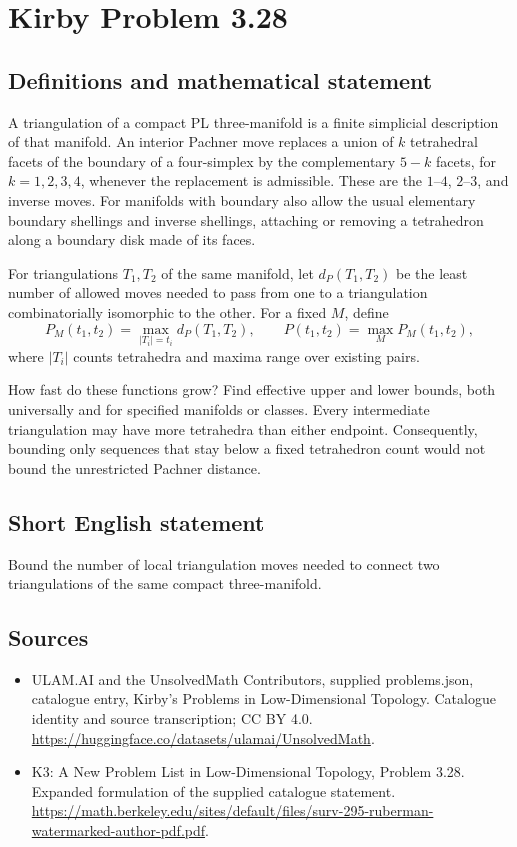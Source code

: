 \documentclass[11pt,a4paper]{article}
\begin{document}
\section*{Kirby Problem 3.28}\label{statement}

\subsection{Definitions and mathematical statement}
A triangulation of a compact PL three-manifold is a finite simplicial
description of that manifold. An interior Pachner move replaces a union
of $k$ tetrahedral facets of the boundary of a four-simplex by the
complementary $5-k$ facets, for $k=1,2,3,4$, whenever the replacement is
admissible. These are the $1$--$4$, $2$--$3$, and inverse moves.
For manifolds with boundary also allow the usual elementary boundary
shellings and inverse shellings, attaching or removing a tetrahedron along
a boundary disk made of its faces.

For triangulations $T_1,T_2$ of the same manifold, let $d_P(T_1,T_2)$ be
the least number of allowed moves needed to pass from one to a triangulation
combinatorially isomorphic to the other. For a fixed $M$, define
\[
 P_M(t_1,t_2)=\max_{|T_i|=t_i}d_P(T_1,T_2),\qquad
 P(t_1,t_2)=\max_M P_M(t_1,t_2),
\]
where $|T_i|$ counts tetrahedra and maxima range over existing pairs.

How fast do these functions grow? Find effective upper and lower bounds,
both universally and for specified manifolds or classes. Every intermediate
triangulation may have more tetrahedra than either endpoint. Consequently,
bounding only sequences that stay below a fixed tetrahedron count would
not bound the unrestricted Pachner distance.
\subsection{Short English statement}
Bound the number of local triangulation moves needed to connect two triangulations of the same compact three-manifold.
\subsection{Sources}
\begin{itemize}
\item[S1] ULAM.AI and the UnsolvedMath Contributors, supplied problems.json, catalogue entry, Kirby's Problems in Low-Dimensional Topology. Catalogue identity and source transcription; CC BY 4.0.
\url{https://huggingface.co/datasets/ulamai/UnsolvedMath}.
\item[S2] K3: A New Problem List in Low-Dimensional Topology, Problem 3.28. Expanded formulation of the supplied catalogue statement.
\url{https://math.berkeley.edu/sites/default/files/surv-295-ruberman-watermarked-author-pdf.pdf}.
\end{itemize}
\end{document}
